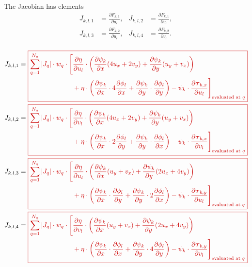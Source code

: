 \documentclass{amsart}
\newcommand{\diff}[2]{\ensuremath{\frac{\partial #1}{\partial #2}}}
\newcommand{\sumQ}{\ensuremath{\sum_{q = 1}^{N_q}}}
\newcommand{\basalshearstress}[1]{\boldsymbol{\tau}_{b#1}}
\newcommand{\taubx}{\basalshearstress{,x}}
\newcommand{\tauby}{\basalshearstress{,y}}
\newcommand{\highlight}[1]{{\color{red!80!black} \fbox{$ \displaystyle #1 $} }}
\begin{document}
The Jacobian has elements
\begin{align*}
  J_{k,l,1} & = \diff{F_{k,1}}{u_l}, & J_{k,l,2} & = \diff{F_{k,1}}{v_l},\\
  J_{k,l,3} & = \diff{F_{k,2}}{u_l}, & J_{k,l,4} & = \diff{F_{k,2}}{v_l}.\\
\end{align*}

\begin{align}
  J_{k,l,1} &= \highlight{
              \begin{aligned}[t]
                \sumQ |J_q| \cdot w_q\cdot \Bigg[&\diff{\eta}{u_l}\cdot
                \left( \diff{\psi_k}{x} (4 u_x + 2 v_y) + \diff{\psi_k}{y} (u_y + v_x) \right)\\
                & + \eta\cdot \left( \diff{\psi_k}{x}\cdot 4 \diff{\phi_l}{x} + \diff{\psi_k}{y}\cdot \diff{\phi_l}{y} \right)
                - \psi_k\cdot \diff{\taubx}{u_l} \Bigg]_{\text{evaluated at } q}\\
              \end{aligned} }\\
  J_{k,l,2} &= \highlight{
              \begin{aligned}[t]
                \sumQ |J_q| \cdot w_q\cdot \Bigg[&\diff{\eta}{v_l}\cdot
                \left( \diff{\psi_k}{x} (4 u_x + 2 v_y) + \diff{\psi_k}{y} (u_y + v_x) \right)\\
                & + \eta\cdot \left( \diff{\psi_k}{x}\cdot 2 \diff{\phi_l}{y} + \diff{\psi_k}{y}\cdot \diff{\phi_l}{x} \right)
                - \psi_k\cdot \diff{\taubx}{v_l} \Bigg]_{\text{evaluated at } q}\\
              \end{aligned} }\\
  J_{k,l,3} &= \highlight{
              \begin{aligned}[t]
                \sumQ |J_q| \cdot w_q\cdot \Bigg[&\diff{\eta}{u_l}\cdot
                \left( \diff{\psi_k}{x} (u_y + v_x) + \diff{\psi_k}{y} (2 u_x + 4 v_y) \right)\\
                & + \eta\cdot \left( \diff{\psi_k}{x}\cdot \diff{\phi_l}{y} + \diff{\psi_k}{y}\cdot 2 \diff{\phi_l}{x} \right)
                - \psi_k\cdot \diff{\tauby}{u_l} \Bigg]_{\text{evaluated at } q}\\
              \end{aligned} }\\
  J_{k,l,4} &= \highlight{
              \begin{aligned}[t]
                \sumQ |J_q| \cdot w_q\cdot \Bigg[&\diff{\eta}{v_l}\cdot
                \left( \diff{\psi_k}{x} (u_y + v_x) + \diff{\psi_k}{y} (2 u_x + 4 v_y) \right)\\
                & + \eta\cdot \left( \diff{\psi_k}{x}\cdot \diff{\phi_l}{x} + \diff{\psi_k}{y}\cdot 4 \diff{\phi_l}{y} \right)
                - \psi_k\cdot \diff{\tauby}{v_l} \Bigg]_{\text{evaluated at } q}\\
              \end{aligned} }
\end{align}
\end{document}
